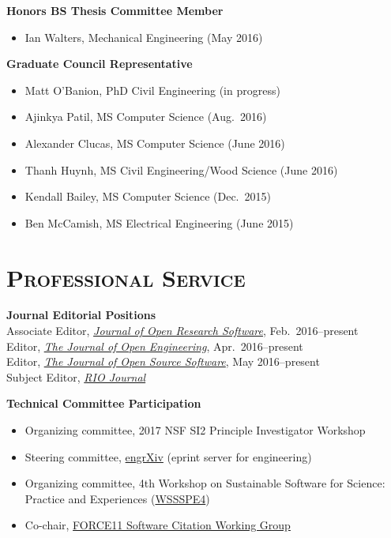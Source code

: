 \documentclass[margin,line,11pt]{res}
\begin{document}
\begin{resume}
\textbf{Honors BS Thesis Committee Member}
\begin{itemize}[leftmargin=*]
\item Ian Walters, Mechanical Engineering (May 2016)
\end{itemize}

\textbf{Graduate Council Representative}
\begin{itemize}[leftmargin=*]
\item Matt O'Banion, PhD Civil Engineering (in progress)
\item Ajinkya Patil, MS Computer Science (Aug.\ 2016)
\item Alexander Clucas, MS Computer Science (June 2016)
\item Thanh Huynh, MS Civil Engineering\slash Wood Science (June 2016)
\item Kendall Bailey, MS Computer Science (Dec.\ 2015)
\item Ben McCamish, MS Electrical Engineering (June 2015)
\end{itemize}

\section{\textsc{Professional Service}}

\textbf{Journal Editorial Positions} \\
Associate Editor, \href{http://openresearchsoftware.metajnl.com}{\emph{Journal of Open Research Software}}, Feb.\ 2016--present \\
Editor, \href{http://www.tjoe.org}{\emph{The Journal of Open Engineering}}, Apr.\ 2016--present \\
Editor, \href{http://joss.theoj.org}{\emph{The Journal of Open Source Software}}, May 2016--present \\
Subject Editor, \href{http://riojournal.com}{\emph{RIO Journal}}

\textbf{Technical Committee Participation}
\begin{itemize}[leftmargin=*]
\item Organizing committee, 2017 NSF SI2 Principle Investigator Workshop
\item Steering committee, \href{http://blog.engrxiv.org/}{engrXiv} (eprint server for engineering)
\item Organizing committee, 4th Workshop on Sustainable Software for Science: Practice and Experiences (\href{http://wssspe.researchcomputing.org.uk/wssspe4/}{WSSSPE4})
\item Co-chair, \href{https://www.force11.org/group/software-citation-working-group}{FORCE11 Software Citation Working Group}
\end{itemize}


\end{resume}
\end{document}
